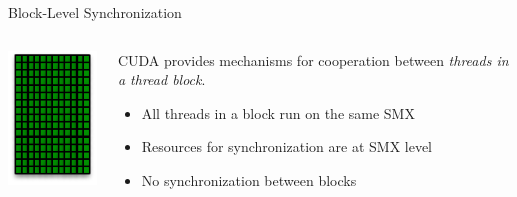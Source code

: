 \begin{frame}[fragile]{Block-Level Synchronization}
    \begin{columns}[T]
        \begin{column}{0.3\textwidth}
            \includegraphics[width=\textwidth]{./images/smx.pdf}
        \end{column}

        \begin{column}{0.7\textwidth}
            \begin{info}{}
            CUDA provides mechanisms for cooperation between \emph{threads in a thread block}.
            \begin{itemize}
                \item All threads in a block run on the same SMX
                \item Resources for synchronization are at SMX level
                \item No synchronization between blocks
            \end{itemize}
            \end{info}
        \end{column}
    \end{columns}

\end{frame}

